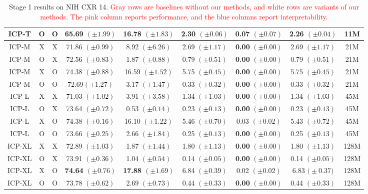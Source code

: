 \documentclass[preprint,7pt, a4paper]{elsarticle}
\begin{document}
\begin{table}
{{\begin{tabular}{c|cc|c|cccc|c}
        ICP-T & O & O & 65.69 $(\pm1.99)$& 16.78 $(\pm1.83)$& 2.30 $(\pm0.06)$& 0.07 $(\pm0.07)$& 2.26 $(\pm0.04)$ & 11M\\
        \midrule
        ICP-M & X & X & 71.86 $(\pm0.99)$ & 8.92 $(\pm6.26)$ & 2.69 $(\pm1.17)$& \textbf{0.00} $\bm{(\pm0.00)}$ & 2.69 $(\pm1.17)$& 21M\\
        ICP-M & O & X & 72.56 $(\pm0.83)$& 1.87 $(\pm0.88)$& 0.79 $(\pm0.51)$& \textbf{0.00} $\bm{(\pm0.00)}$ & 0.79 $(\pm0.51)$ & 21M\\
        ICP-M & X & O & 74.38 $(\pm0.88)$ & 16.59 $(\pm1.52)$ & 5.75 $(\pm0.45)$& \textbf{0.00} $\bm{(\pm0.00)}$ & 5.75 $(\pm0.45)$ & 21M\\
        ICP-M & O & O & 72.69$(\pm1.27)$& 3.17 $(\pm1.47)$& 0.33 $(\pm0.32)$& \textbf{0.00} $\bm{(\pm0.00)}$ & 0.33 $(\pm0.32)$ & 21M\\
        \midrule
        ICP-L & X & X & 71.03 $(\pm1.02)$ & 3.91 $(\pm3.58)$ & 1.34 $(\pm1.03)$& \textbf{0.00} $\bm{(\pm0.00)}$ & 1.34 $(\pm1.03)$ & 45M\\
        ICP-L & O & X & 73.64 $(\pm0.72)$& 0.53 $(\pm0.14)$& 0.23 $(\pm0.13)$& \textbf{0.00} $\bm{(\pm0.00)}$ & 0.23 $(\pm0.13)$ & 45M\\
        \rowcolor{LemonChiffon1}
        ICP-L & X & O & 74.38 $(\pm0.16)$ & 16.10 $(\pm1.22)$ & 5.46  $(\pm0.70)$& 0.03 $(\pm0.02)$& 5.43 $(\pm0.72)$ & 45M\\
        ICP-L & O & O & 73.66 $(\pm 0.25)$& 2.66 $(\pm1.84)$& 0.25 $(\pm0.13)$& \textbf{0.00} $\bm{(\pm0.00)}$ & 0.25 $(\pm0.13)$ & 45M\\
        \midrule
        ICP-XL & X & X & 72.89 $(\pm1.03)$& 1.87 $(\pm1.44)$ & 1.80 $(\pm1.13)$& \textbf{0.00} $\bm{(\pm0.00)}$ & 1.80 $(\pm1.13)$ & 128M\\
        ICP-XL & O & X & 73.91 $(\pm0.36)$& 1.04 $(\pm0.54)$ & 0.14 $(\pm0.05)$& \textbf{0.00} $\bm{(\pm0.00)}$ & 0.14 $(\pm0.05)$ & 128M\\
        ICP-XL & X & O & \textbf{74.64 $\bm{(\pm0.76)}$} & \textbf{17.88 $\bm{(\pm1.69)}$} & 6.84 $(\pm0.39)$& 0.02 $(\pm0.02)$ & 6.83 $\bm(\pm0.37)$ & 128M\\
        ICP-XL & O & O & 73.78 $(\pm0.62)$& 2.69 $(\pm0.73)$& 0.44 $(\pm0.33)$& \textbf{0.00} $\bm{(\pm0.00)}$ & 0.44 $(\pm0.33)$ & 128M\\
        \bottomrule
    \end{tabular}
    }}
    \caption{Stage 1 results on NIH CXR 14. \textcolor{red}{Gray rows are baselines without our methods, and white rows are variants of our methods. The pink column reports performance, and the blue columns report interpretability.}}
    \label{tab:1}
\end{table}
\end{document}
